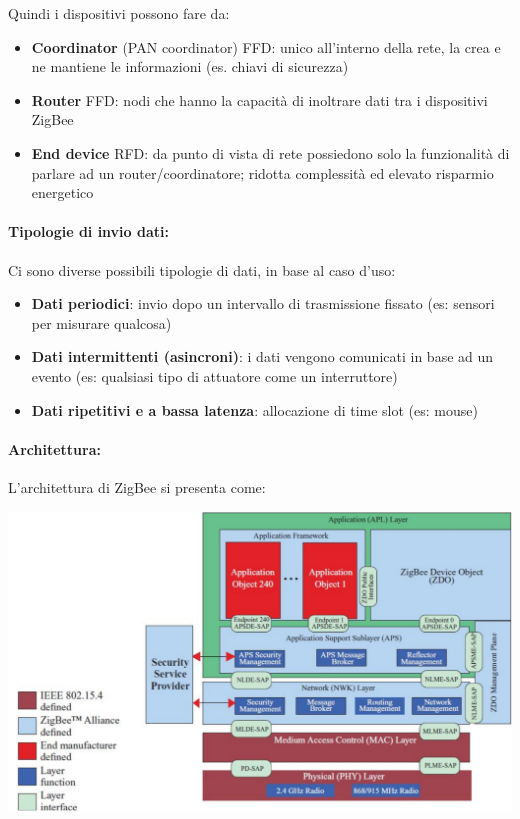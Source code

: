 Quindi i dispositivi possono fare da:
\begin{itemize}
	\item \textbf{Coordinator} (PAN coordinator) FFD: unico all'interno della rete, la crea e ne mantiene le informazioni (es. chiavi di sicurezza)
	\item \textbf{Router} FFD: nodi che hanno la capacità di inoltrare dati tra i dispositivi ZigBee
	\item \textbf{End device} RFD: da punto di vista di rete possiedono solo la funzionalità di parlare ad un router/coordinatore; ridotta complessità ed elevato risparmio energetico
\end{itemize}

\paragraph{Tipologie di invio dati:} Ci sono diverse possibili tipologie di dati, in base al caso d'uso: 
\begin{itemize}
	\item \textbf{Dati periodici}: invio dopo un intervallo di trasmissione fissato (es: sensori per misurare qualcosa)
	\item \textbf{Dati intermittenti (asincroni)}: i dati vengono comunicati in base ad un evento (es: qualsiasi tipo di attuatore come un interruttore)
	\item \textbf{Dati ripetitivi e a bassa latenza}: allocazione di time slot (es: mouse)
\end{itemize}

\newpage

\paragraph{Architettura:} L'architettura di ZigBee si presenta come:
\begin{center}
	\includegraphics[width=0.98\linewidth]{img/wpan/zarch}
\end{center}

